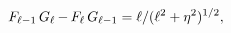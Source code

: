 \[\mathop{F_{\ell-1}\/}\nolimits\mathop{G_{\ell}\/}\nolimits-\mathop{F_{\ell}\/}%
\nolimits\mathop{G_{\ell-1}\/}\nolimits=\ell/(\ell^{2}+\eta^{2})^{1/2},\]